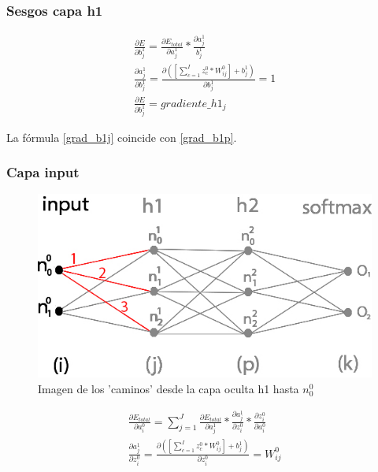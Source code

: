 \subsubsection{Sesgos capa h1}

\begin{gather}
	\frac{\partial E}{\partial b^1_j} = \frac{\partial E_{total} }{\partial a^1_j } * \frac{\partial a^1_j}{b^1_j} \\
	\frac{\partial a^1_j }{\partial b^1_j } = \frac{\partial ([\sum_{c=1}^{I} z^0_c * W^0_{ij}] + b^1_j) }{\partial b^1_j } = 1 \\
	\frac{\partial E}{\partial b^1_j} = gradiente\_h1_j
	\label{grad_b1j}
\end{gather}

La fórmula \ref{grad_b1j} coincide con \ref{grad_b1p}. \\

\subsubsection{Capa input}

\begin{figure}[H]
	\centering
	\includegraphics[scale=0.35]{imagenes/nn_2_capas_caminos_posibles_input.jpg}  
	\caption{Imagen de los 'caminos' desde la capa oculta h1 hasta $n^0_0$}
	\label{nn_2_capas_caminos_posibles_input}
\end{figure}

\begin{gather}
	\frac{\partial E_{total}}{\partial a^0_i} = \sum_{j=1}^J \frac{\partial E_{total}}{\partial a^1_j} * \frac{\partial a^1_j}{\partial z^0_i} * \frac{\partial z^0_i}{\partial a^0_i} \\
	\frac{\partial a^1_j }{\partial z^0_i } = \frac{\partial ([\sum_{c=1}^{I} z^0_c * W^0_{ij}] + b^1_j) }{\partial z^0_i } = W^0_{ij}
\end{gather}


